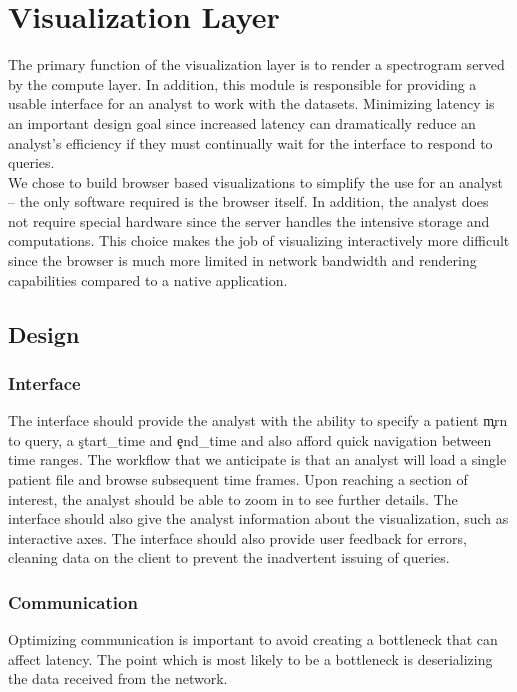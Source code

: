 \chapter{Visualization Layer}\label{viz-ch}

The primary function of the visualization layer is to render a spectrogram
served by the compute layer. In addition, this module is responsible for
providing a usable interface for an analyst to work with the datasets.
Minimizing latency is an important design goal since increased latency can
dramatically reduce an analyst's efficiency if they must continually wait for
the interface to respond to queries. \\

We chose to build browser based visualizations to simplify the use for an
analyst -- the only software required is the browser itself. In addition, the
analyst does not require special hardware since the server handles the
intensive storage and computations.  This choice makes the job of visualizing
interactively more difficult since the browser is much more limited in network
bandwidth and rendering capabilities compared to a native application.

\section{Design}

\subsection{Interface}

The interface should provide the analyst with the ability to specify a patient
\c{mrn} to query, a \c{start\_time} and \c{end\_time} and also afford quick
navigation between time ranges. The workflow that we anticipate is that an
analyst will load a single patient file and browse subsequent time frames. Upon
reaching a section of interest, the analyst should be able to zoom in to see
further details. The interface should also give the analyst information about
the visualization, such as interactive axes. The interface should also provide
user feedback for errors, cleaning data on the client to prevent the
inadvertent issuing of queries.

\subsection{Communication}

Optimizing communication is important to avoid creating a bottleneck that can
affect latency. The point which is most likely to be a bottleneck is
deserializing the data received from the network.

